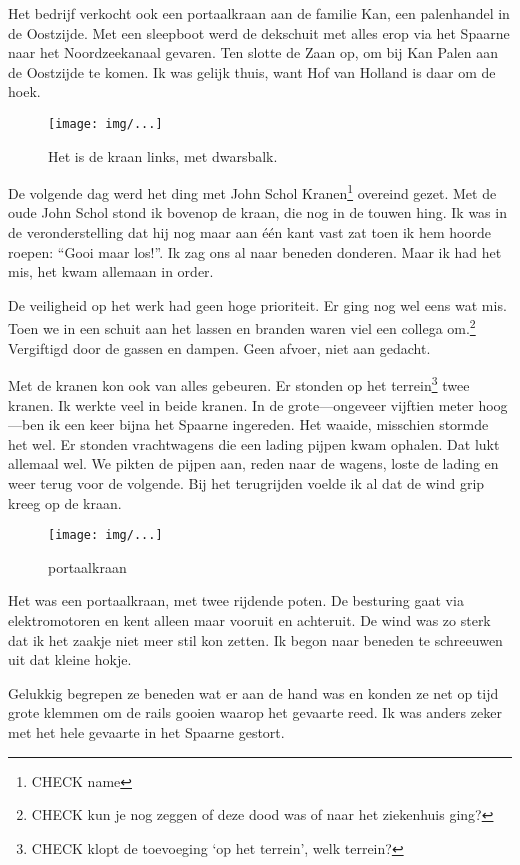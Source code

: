 \documentclass[10pt,twoside,openright]{memoir}
\begin{document}
Het bedrijf verkocht ook een portaalkraan aan de familie Kan, een palenhandel in de Oostzijde. Met een sleepboot werd de dekschuit met alles erop via het Spaarne naar het Noordzeekanaal gevaren. Ten slotte de Zaan op, om bij Kan Palen aan de Oostzijde te komen. Ik was gelijk thuis, want Hof van Holland is daar om de hoek. 

\begin{figure}[t]
\texttt{[image: img/...]}
\caption{Het is de kraan links, met dwarsbalk.}
\end{figure}

De volgende dag werd het ding met John Schol Kranen\footnote{CHECK name} overeind gezet. Met de oude John Schol stond ik bovenop de kraan, die nog in de touwen hing. Ik was in de veronderstelling dat hij nog maar aan één kant vast zat toen ik hem hoorde roepen: ``Gooi maar los!''. Ik zag ons al naar beneden donderen. Maar ik had het mis, het kwam allemaan in order. 

De veiligheid op het werk had geen hoge prioriteit. Er ging nog wel eens wat mis. Toen we in een schuit aan het lassen en branden waren viel een collega om.\footnote{CHECK kun je nog zeggen of deze dood was of naar het ziekenhuis ging?} Vergiftigd door de gassen en dampen. Geen afvoer, niet aan gedacht. 

Met de kranen kon ook van alles gebeuren. Er stonden op het terrein\footnote{CHECK klopt de toevoeging `op het terrein', welk terrein?} twee kranen. Ik werkte veel in beide kranen. In de grote---ongeveer vijftien meter hoog---ben ik een keer bijna het Spaarne ingereden. Het waaide, misschien stormde het wel. Er stonden vrachtwagens die een lading pijpen kwam ophalen. Dat lukt allemaal wel. We pikten de pijpen aan, reden naar de wagens, loste de lading en weer terug voor de volgende. Bij het terugrijden voelde ik al dat de wind grip kreeg op de kraan. 

\begin{figure}[t]
\texttt{[image: img/...]}
\caption{portaalkraan}
\end{figure}

Het was een portaalkraan, met twee rijdende poten. De besturing gaat via elektromotoren en kent alleen maar vooruit en achteruit. De wind was zo sterk dat ik het zaakje niet meer stil kon zetten. Ik begon naar beneden te schreeuwen uit dat kleine hokje. 

Gelukkig begrepen ze beneden wat er aan de hand was en konden ze net op tijd grote klemmen om de rails gooien waarop het gevaarte reed. Ik was anders zeker met het hele gevaarte in het Spaarne gestort.
\end{document}
